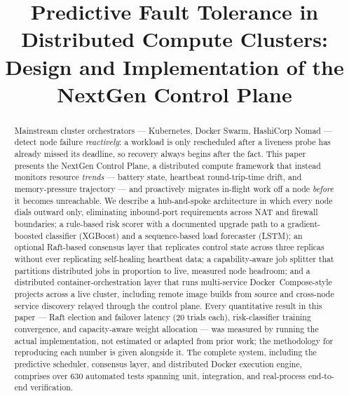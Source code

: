 \documentclass[conference]{IEEEtran}
\begin{document}
\title{Predictive Fault Tolerance in Distributed Compute Clusters:\\
Design and Implementation of the NextGen Control Plane}

\author{
}

\maketitle

\begin{abstract}
Mainstream cluster orchestrators — Kubernetes, Docker Swarm, HashiCorp Nomad — detect node failure
\emph{reactively}: a workload is only rescheduled after a liveness probe has already missed its
deadline, so recovery always begins after the fact. This paper presents the NextGen Control Plane, a
distributed compute framework that instead monitors resource \emph{trends} — battery state, heartbeat
round-trip-time drift, and memory-pressure trajectory — and proactively migrates in-flight work off a
node \emph{before} it becomes unreachable. We describe a hub-and-spoke architecture in which every node
dials outward only, eliminating inbound-port requirements across NAT and firewall boundaries; a
rule-based risk scorer with a documented upgrade path to a gradient-boosted classifier (XGBoost) and a
sequence-based load forecaster (LSTM); an optional Raft-based consensus layer that replicates control
state across three replicas without ever replicating self-healing heartbeat data; a
capability-aware job splitter that partitions distributed jobs in proportion to live, measured node
headroom; and a distributed container-orchestration layer that runs multi-service
Docker~Compose-style projects across a live cluster, including remote image builds from source and
cross-node service discovery relayed through the control plane. Every quantitative result in this
paper — Raft election and failover latency (20 trials each), risk-classifier training convergence, and
capacity-aware weight allocation — was measured by running the actual implementation, not estimated or
adapted from prior work; the methodology for reproducing each number is given alongside it. The
complete system, including the predictive scheduler, consensus layer, and distributed Docker execution
engine, comprises over 630 automated tests spanning unit, integration, and real-process end-to-end
verification.
\end{abstract}
\end{document}
